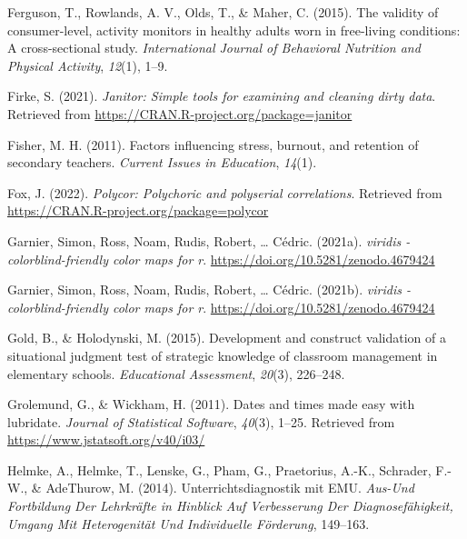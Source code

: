 \documentclass[
  man]{apa6}
\newlength{\cslhangindent}
\newlength{\cslentryspacingunit} %
\newenvironment{CSLReferences}[2] %
 {%
  \setlength{\parindent}{0pt}
  \ifodd #1
  \let\oldpar\par
  \def\par{\hangindent=\cslhangindent\oldpar}
  \fi
  \setlength{\parskip}{#2\cslentryspacingunit}
 }%
 {}
\begin{document}
\begin{CSLReferences}{1}{0}
\leavevmode{}%
Ferguson, T., Rowlands, A. V., Olds, T., \& Maher, C. (2015). The validity of consumer-level, activity monitors in healthy adults worn in free-living conditions: A cross-sectional study. \emph{International Journal of Behavioral Nutrition and Physical Activity}, \emph{12}(1), 1--9.

\leavevmode{}%
Firke, S. (2021). \emph{Janitor: Simple tools for examining and cleaning dirty data}. Retrieved from \url{https://CRAN.R-project.org/package=janitor}

\leavevmode{}%
Fisher, M. H. (2011). Factors influencing stress, burnout, and retention of secondary teachers. \emph{Current Issues in Education}, \emph{14}(1).

\leavevmode{}%
Fox, J. (2022). \emph{Polycor: Polychoric and polyserial correlations}. Retrieved from \url{https://CRAN.R-project.org/package=polycor}

\leavevmode{}%
Garnier, Simon, Ross, Noam, Rudis, Robert, \ldots{} Cédric. (2021a). \emph{{viridis} - colorblind-friendly color maps for r}. \url{https://doi.org/10.5281/zenodo.4679424}

\leavevmode{}%
Garnier, Simon, Ross, Noam, Rudis, Robert, \ldots{} Cédric. (2021b). \emph{{viridis} - colorblind-friendly color maps for r}. \url{https://doi.org/10.5281/zenodo.4679424}

\leavevmode{}%
Gold, B., \& Holodynski, M. (2015). Development and construct validation of a situational judgment test of strategic knowledge of classroom management in elementary schools. \emph{Educational Assessment}, \emph{20}(3), 226--248.

\leavevmode{}%
Grolemund, G., \& Wickham, H. (2011). Dates and times made easy with {lubridate}. \emph{Journal of Statistical Software}, \emph{40}(3), 1--25. Retrieved from \url{https://www.jstatsoft.org/v40/i03/}

\leavevmode{}%
Helmke, A., Helmke, T., Lenske, G., Pham, G., Praetorius, A.-K., Schrader, F.-W., \& AdeThurow, M. (2014). Unterrichtsdiagnostik mit EMU. \emph{Aus-Und Fortbildung Der Lehrkr{ä}fte in Hinblick Auf Verbesserung Der Diagnosef{ä}higkeit, Umgang Mit Heterogenit{ä}t Und Individuelle F{ö}rderung}, 149--163.


\end{CSLReferences}
\end{document}
